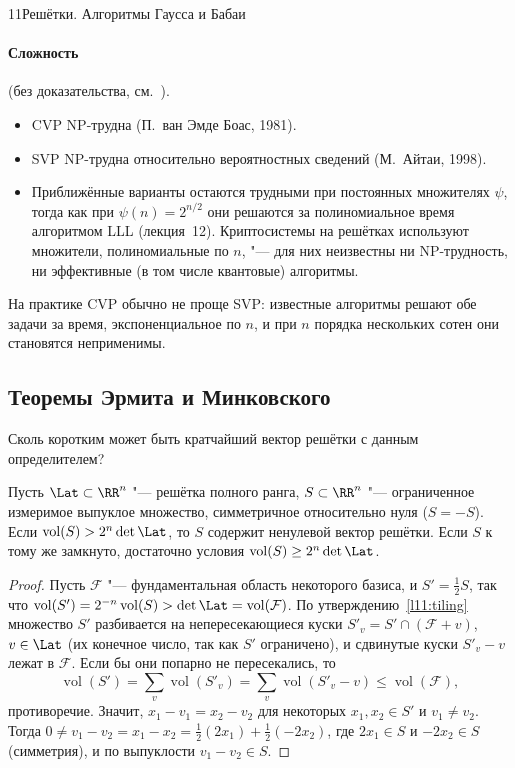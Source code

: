 \begin{lecture}{11}{Решётки. Алгоритмы Гаусса и Бабаи}
\paragraph{Сложность} (без доказательства, см.~\cite[гл.~3, 4]{micciancio-goldwasser}).
\begin{itemize}
  \item CVP NP-трудна (П.~ван Эмде Боас, 1981).
  \item SVP NP-трудна относительно вероятностных сведений (М.~Айтаи, 1998).
  \item Приближённые варианты остаются трудными при постоянных множителях $\psi$, тогда как
    при $\psi(n) = 2^{n/2}$ они решаются за полиномиальное время алгоритмом LLL (лекция~12).
    Криптосистемы на решётках используют множители, полиномиальные по $n$, "--- для них
    неизвестны ни NP-трудность, ни эффективные (в том числе квантовые) алгоритмы.
\end{itemize}

На практике CVP обычно не проще SVP: известные алгоритмы решают обе задачи за время,
экспоненциальное по $n$, и при $n$ порядка нескольких сотен они становятся неприменимы.

\subsection{Теоремы Эрмита и Минковского}

Сколь коротким может быть кратчайший вектор решётки с данным определителем?

\begin{theorem}\label{l11:minkowski}
Пусть $\Lat \subset \RR^n$ "--- решётка полного ранга, $S \subset \RR^n$ "--- ограниченное
измеримое выпуклое множество, симметричное относительно нуля ($S = -S$). Если
$\operatorname{vol}(S) > 2^n \det \Lat$, то $S$ содержит ненулевой вектор решётки. Если $S$ к тому
же замкнуто, достаточно условия $\operatorname{vol}(S) \ge 2^n \det \Lat$.
\end{theorem}

\begin{proof}
Пусть $\mathcal F$ "--- фундаментальная область некоторого базиса, и $S' = \frac12 S$, так что
$\operatorname{vol}(S') = 2^{-n}\operatorname{vol}(S) > \det \Lat = \operatorname{vol}(\mathcal F)$.
По утверждению~\ref{l11:tiling} множество $S'$ разбивается на непересекающиеся куски
$S'_v = S' \cap (\mathcal F + v)$, $v \in \Lat$ (их конечное число, так как $S'$ ограничено), и
сдвинутые куски $S'_v - v$ лежат в $\mathcal F$. Если бы они попарно не пересекались, то
\[
  \operatorname{vol}(S') = \sum_v \operatorname{vol}(S'_v) = \sum_v \operatorname{vol}(S'_v - v)
  \le \operatorname{vol}(\mathcal F),
\]
противоречие. Значит, $x_1 - v_1 = x_2 - v_2$ для некоторых $x_1, x_2 \in S'$ и $v_1 \ne v_2$.
Тогда $0 \ne v_1 - v_2 = x_1 - x_2 = \frac12(2x_1) + \frac12(-2x_2)$, где $2x_1 \in S$ и
$-2x_2 \in S$ (симметрия), и по выпуклости $v_1 - v_2 \in S$.


\end{proof}
\end{lecture}
